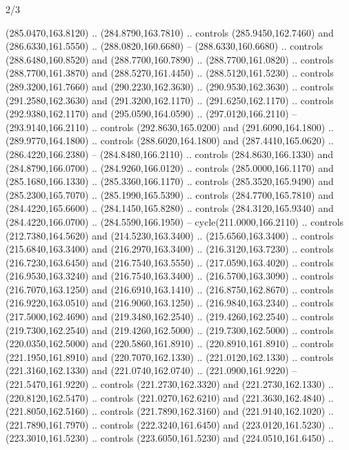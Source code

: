 \begin{flagdescription}{2/3}
\begin{scope}[xshift=0.5\flaglength,yshift=0.5\flagwidth,scale=\flagwidth/259.2]
\begin{scope}[y=0.8pt, x=0.8pt, yscale=-1,shift={(-243,-162)}]
      (285.0470,163.8120) .. (284.8790,163.7810) .. controls (285.9450,162.7460) and
      (286.6330,161.5550) .. (288.0820,160.6680) -- (288.6330,160.6680) .. controls
      (288.6480,160.8520) and (288.7700,160.7890) .. (288.7700,161.0820) .. controls
      (288.7700,161.3870) and (288.5270,161.4450) .. (288.5120,161.5230) .. controls
      (289.3200,161.7660) and (290.2230,162.3630) .. (290.9530,162.3630) .. controls
      (291.2580,162.3630) and (291.3200,162.1170) .. (291.6250,162.1170) .. controls
      (292.9380,162.1170) and (295.0590,164.0590) .. (297.0120,166.2110) --
      (293.9140,166.2110) .. controls (292.8630,165.0200) and (291.6090,164.1800) ..
      (289.9770,164.1800) .. controls (288.6020,164.1800) and (287.4410,165.0620) ..
      (286.4220,166.2380) -- (284.8480,166.2110) .. controls (284.8630,166.1330) and
      (284.8790,166.0700) .. (284.9260,166.0120) .. controls (285.0000,166.1170) and
      (285.1680,166.1330) .. (285.3360,166.1170) .. controls (285.3520,165.9490) and
      (285.2300,165.7070) .. (285.1990,165.5390) .. controls (284.7700,165.7810) and
      (284.4220,165.6600) .. (284.1450,165.8280) .. controls (284.3120,165.9340) and
      (284.4220,166.0700) .. (284.5590,166.1950) -- cycle(211.0000,166.2110) ..
      controls (212.7380,164.5620) and (214.5230,163.3400) .. (215.6560,163.3400) ..
      controls (215.6840,163.3400) and (216.2970,163.3400) .. (216.3120,163.7230) ..
      controls (216.7230,163.6450) and (216.7540,163.5550) .. (217.0590,163.4020) ..
      controls (216.9530,163.3240) and (216.7540,163.3400) .. (216.5700,163.3090) ..
      controls (216.7070,163.1250) and (216.6910,163.1410) .. (216.8750,162.8670) ..
      controls (216.9220,163.0510) and (216.9060,163.1250) .. (216.9840,163.2340) ..
      controls (217.5000,162.4690) and (219.3480,162.2540) .. (219.4260,162.2540) ..
      controls (219.7300,162.2540) and (219.4260,162.5000) .. (219.7300,162.5000) ..
      controls (220.0350,162.5000) and (220.5860,161.8910) .. (220.8910,161.8910) ..
      controls (221.1950,161.8910) and (220.7070,162.1330) .. (221.0120,162.1330) ..
      controls (221.3160,162.1330) and (221.0740,162.0740) .. (221.0900,161.9220) --
      (221.5470,161.9220) .. controls (221.2730,162.3320) and (221.2730,162.1330) ..
      (220.8120,162.5470) .. controls (221.0270,162.6210) and (221.3630,162.4840) ..
      (221.8050,162.5160) .. controls (221.7890,162.3160) and (221.9140,162.1020) ..
      (221.7890,161.7970) .. controls (222.3240,161.6450) and (223.0120,161.5230) ..
      (223.3010,161.5230) .. controls (223.6050,161.5230) and (224.0510,161.6450) ..

\end{scope}
\end{scope}
\end{flagdescription}
